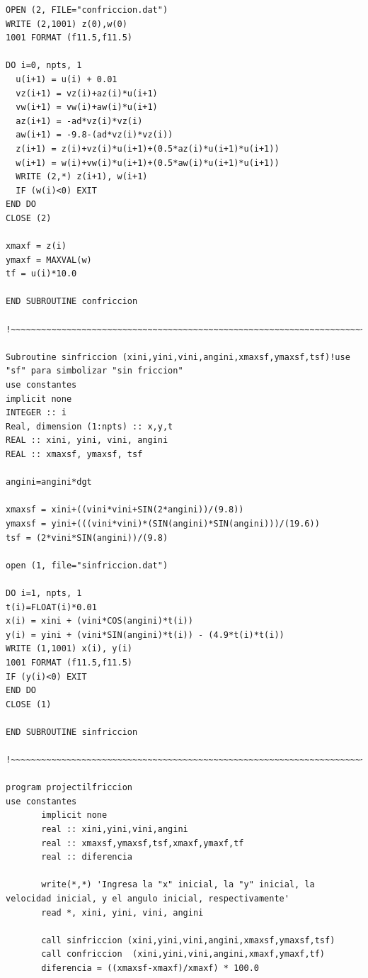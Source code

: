 \documentclass[12pt]{article}
\begin{document}
\begin{verbatim}
OPEN (2, FILE="confriccion.dat")
WRITE (2,1001) z(0),w(0)
1001 FORMAT (f11.5,f11.5)

DO i=0, npts, 1
  u(i+1) = u(i) + 0.01
  vz(i+1) = vz(i)+az(i)*u(i+1)
  vw(i+1) = vw(i)+aw(i)*u(i+1)
  az(i+1) = -ad*vz(i)*vz(i)
  aw(i+1) = -9.8-(ad*vz(i)*vz(i))
  z(i+1) = z(i)+vz(i)*u(i+1)+(0.5*az(i)*u(i+1)*u(i+1))
  w(i+1) = w(i)+vw(i)*u(i+1)+(0.5*aw(i)*u(i+1)*u(i+1))
  WRITE (2,*) z(i+1), w(i+1)
  IF (w(i)<0) EXIT
END DO
CLOSE (2)

xmaxf = z(i)
ymaxf = MAXVAL(w)
tf = u(i)*10.0

END SUBROUTINE confriccion

!~~~~~~~~~~~~~~~~~~~~~~~~~~~~~~~~~~~~~~~~~~~~~~~~~~~~~~~~~~~~~~~~~~~~~~~~~~~~~~~~~~~~~~~~~~~~~~~~

Subroutine sinfriccion (xini,yini,vini,angini,xmaxsf,ymaxsf,tsf)!use "sf" para simbolizar "sin friccion"
use constantes
implicit none
INTEGER :: i
Real, dimension (1:npts) :: x,y,t
REAL :: xini, yini, vini, angini   
REAL :: xmaxsf, ymaxsf, tsf    

angini=angini*dgt

xmaxsf = xini+((vini*vini+SIN(2*angini))/(9.8))
ymaxsf = yini+(((vini*vini)*(SIN(angini)*SIN(angini)))/(19.6))
tsf = (2*vini*SIN(angini))/(9.8)

open (1, file="sinfriccion.dat")

DO i=1, npts, 1
t(i)=FLOAT(i)*0.01
x(i) = xini + (vini*COS(angini)*t(i))
y(i) = yini + (vini*SIN(angini)*t(i)) - (4.9*t(i)*t(i))
WRITE (1,1001) x(i), y(i)
1001 FORMAT (f11.5,f11.5)
IF (y(i)<0) EXIT
END DO
CLOSE (1)

END SUBROUTINE sinfriccion

!~~~~~~~~~~~~~~~~~~~~~~~~~~~~~~~~~~~~~~~~~~~~~~~~~~~~~~~~~~~~~~~~~~~~~~~~~~~~~~~~~~~~~~~~~~~~~~

program projectilfriccion
use constantes  
       implicit none  
       real :: xini,yini,vini,angini
       real :: xmaxsf,ymaxsf,tsf,xmaxf,ymaxf,tf
       real :: diferencia 
       
       write(*,*) 'Ingresa la "x" inicial, la "y" inicial, la velocidad inicial, y el angulo inicial, respectivamente'   
       read *, xini, yini, vini, angini
   
       call sinfriccion (xini,yini,vini,angini,xmaxsf,ymaxsf,tsf)
       call confriccion  (xini,yini,vini,angini,xmaxf,ymaxf,tf)
       diferencia = ((xmaxsf-xmaxf)/xmaxf) * 100.0



\end{verbatim}
\end{document}
